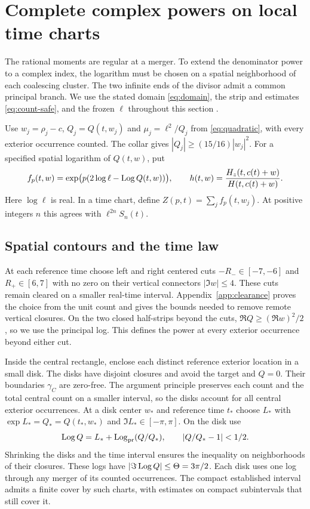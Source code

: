 \section{Complete complex powers on local time charts}
\label{sec:complex}

The rational moments are regular at a merger. To extend the denominator
power to a complex index, the logarithm must be chosen on a spatial
neighborhood of each coalescing cluster. The two infinite ends of the
divisor admit a common principal branch. We use the stated domain
\eqref{eq:domain}, the strip and estimates \eqref{eq:count-safe}, and the
frozen \(\ell\) throughout this section \cite{BakerBase,BakerGT41,BakerCM03}.

Use \(w_j=\rho_j-c\), \(Q_j=Q(t,w_j)\) and
\(\mu_j=\ell^2/Q_j\) from \eqref{eq:quadratic}, with every exterior
occurrence counted. The collar gives \(|Q_j|\ge(15/16)|w_j|^2\).
For a specified spatial logarithm of \(Q(t,w)\), put
\[
 f_p(t,w)=\exp\!\big(p(2\log\ell-\operatorname{Log} Q(t,w))\big),\qquad
 h(t,w)=\frac{H_z(t,c(t)+w)}{H(t,c(t)+w)} .
\]
Here \(\log\ell\) is real. In a time chart, define
\(Z(p,t)=\sum_j f_p(t,w_j)\). At positive integers \(n\) this agrees
with \(\ell^{2n} S_n(t)\).

\subsection{Spatial contours and the time law}

At each reference time choose left and right centered cuts
\(-R_-\in[-7,-6]\) and \(R_+\in[6,7]\) with no zero on their
vertical connectors \(|\Im w|\le4\). These cuts remain cleared on
a smaller real-time interval. Appendix~\ref{app:clearance} proves the
choice from the unit count and gives the bounds needed to remove remote
vertical closures. On the two closed half-strips beyond the cuts,
\(\Re Q\ge(\Re w)^2/2\), so we use the principal log. This defines
the power at every exterior occurrence beyond either cut.

Inside the central rectangle, enclose each distinct reference
exterior location in a small disk. The disks have disjoint closures
and avoid the target and \(Q=0\). Their boundaries \(\gamma_C\) are
zero-free. The argument principle preserves each count and the total
central count on a smaller interval, so the disks account for all
central exterior occurrences. At a disk center \(w_*\) and reference
time \(t_*\) choose \(L_*\) with \(\exp L_*=Q_*=Q(t_*,w_*)\) and
\(\Im L_*\in[-\pi,\pi]\). On the disk use
\begin{equation}
 \operatorname{Log} Q=L_*+\operatorname{Log}_{\rm pr}(Q/Q_*),\qquad |Q/Q_*-1|<1/2 .
 \label{cp:local-log}
\end{equation}
Shrinking the disks and the time interval ensures the inequality on
neighborhoods of their closures. These logs have
\(|\Im\operatorname{Log} Q|\le\Theta=3\pi/2\). Each disk uses one log through any
merger of its counted occurrences. The compact established interval admits a
finite cover by such charts, with estimates on compact subintervals
that still cover it.

